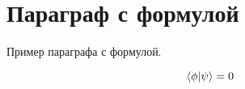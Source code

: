 \section{Параграф с формулой}

Пример параграфа с формулой.

\begin{equation}
    \bra{\phi} \ket{\psi} = 0
\end{equation}
